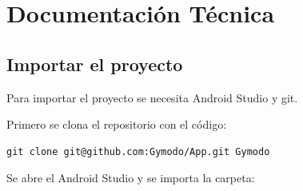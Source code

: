 \documentclass[12pt,a4paper]{article}
\begin{document}
\clearpage

\section{Documentación Técnica}

\subsection{Importar el proyecto}

Para importar el proyecto se necesita Android Studio y git.

Primero se clona el repositorio con el código:
\begin{lstlisting}
git clone git@github.com:Gymodo/App.git Gymodo
\end{lstlisting}

Se abre el Android Studio y se importa la carpeta:
\end{document}
